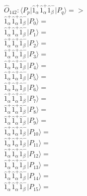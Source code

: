 \documentclass[14pt]{article}
\begin{document}
    $\hat{O}_{142}:  \langle{P_p}\vert \hat{1}_{\alpha}^{+}\hat{1}_{\alpha}^{+}\hat{1}_{\beta}^{-} \vert{P_q}\rangle => $ \\ 
    $ \hat{1}_{\alpha}^{+}\hat{1}_{\alpha}^{+}\hat{1}_{\beta}^{-} \vert{P_{0}}\rangle =  $ \\ 
    $ \hat{1}_{\alpha}^{+}\hat{1}_{\alpha}^{+}\hat{1}_{\beta}^{-} \vert{P_{1}}\rangle =  $ \\ 
    $ \hat{1}_{\alpha}^{+}\hat{1}_{\alpha}^{+}\hat{1}_{\beta}^{-} \vert{P_{2}}\rangle =  $ \\ 
    $ \hat{1}_{\alpha}^{+}\hat{1}_{\alpha}^{+}\hat{1}_{\beta}^{-} \vert{P_{3}}\rangle =  $ \\ 
    $ \hat{1}_{\alpha}^{+}\hat{1}_{\alpha}^{+}\hat{1}_{\beta}^{-} \vert{P_{4}}\rangle =  $ \\ 
    $ \hat{1}_{\alpha}^{+}\hat{1}_{\alpha}^{+}\hat{1}_{\beta}^{-} \vert{P_{5}}\rangle =  $ \\ 
    $ \hat{1}_{\alpha}^{+}\hat{1}_{\alpha}^{+}\hat{1}_{\beta}^{-} \vert{P_{6}}\rangle =  $ \\ 
    $ \hat{1}_{\alpha}^{+}\hat{1}_{\alpha}^{+}\hat{1}_{\beta}^{-} \vert{P_{7}}\rangle =  $ \\ 
    $ \hat{1}_{\alpha}^{+}\hat{1}_{\alpha}^{+}\hat{1}_{\beta}^{-} \vert{P_{8}}\rangle =  $ \\ 
    $ \hat{1}_{\alpha}^{+}\hat{1}_{\alpha}^{+}\hat{1}_{\beta}^{-} \vert{P_{9}}\rangle =  $ \\ 
    $ \hat{1}_{\alpha}^{+}\hat{1}_{\alpha}^{+}\hat{1}_{\beta}^{-} \vert{P_{10}}\rangle =  $ \\ 
    $ \hat{1}_{\alpha}^{+}\hat{1}_{\alpha}^{+}\hat{1}_{\beta}^{-} \vert{P_{11}}\rangle =  $ \\ 
    $ \hat{1}_{\alpha}^{+}\hat{1}_{\alpha}^{+}\hat{1}_{\beta}^{-} \vert{P_{12}}\rangle =  $ \\ 
    $ \hat{1}_{\alpha}^{+}\hat{1}_{\alpha}^{+}\hat{1}_{\beta}^{-} \vert{P_{13}}\rangle =  $ \\ 
    $ \hat{1}_{\alpha}^{+}\hat{1}_{\alpha}^{+}\hat{1}_{\beta}^{-} \vert{P_{14}}\rangle =  $ \\ 
    $ \hat{1}_{\alpha}^{+}\hat{1}_{\alpha}^{+}\hat{1}_{\beta}^{-} \vert{P_{15}}\rangle =  $ \\ 
    
\end{document}
